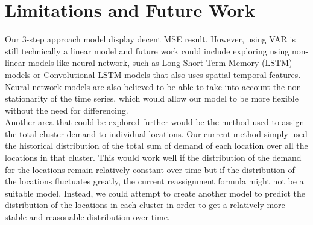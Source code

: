 \documentclass[nonblindrev,msom]{informs3} %
\begin{document}
\section{Limitations and Future Work}
Our 3-step approach model display decent MSE result. However, using VAR is still technically a linear model and future work could include exploring using non-linear models like neural network, such as Long Short-Term Memory (LSTM) models or Convolutional LSTM models that also uses spatial-temporal features. Neural network models are also believed to be able to take into account the non-stationarity of the time series, which would allow our model to be more flexible without the need for differencing. \\

\noindent Another area that could be explored further would be the method used to assign the total cluster demand to individual locations. Our current method simply used the historical distribution of the total sum of demand of each location over all the locations in that cluster. This would work well if the distribution of the demand for the locations remain relatively constant over time but if the distribution of the locations fluctuates greatly, the current reassignment formula might not be a suitable model. Instead, we could attempt to create another model to predict the distribution of the locations in each cluster in order to get a relatively more stable and reasonable distribution over time. 

\newpage



%
%
%



\end{document}
